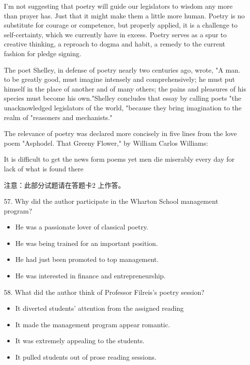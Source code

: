 \documentclass[UTF8,11pt]{ctexart}
\begin{document}
I'm not suggesting that poetry will guide our legislators to wisdom any more than prayer has. Just that it might make them a little more human. Poetry is no substitute for courage or competence, but properly applied, it is a challenge to self-certainty, which we currently have in excess. Poetry serves as a spur to creative thinking, a reproach to dogma and habit, a remedy to the current fashion for pledge signing.


The poet Shelley, in defense of poetry nearly two centuries ago, wrote, "A man. to be greatly good, must imagine intensely and comprehensively; he must put himself in the place of another and of many others; the pains and pleasures of his species must become his own."Shelley concludes that essay by calling poets "the unacknowledged legislators of the world, "because they bring imagination to the realm of "reasoners and mechanists."


The relevance of poetry was declared more concisely in five lines from the love poem "Asphodel. That Greeny Flower," by William Carlos Williams:


It is difficult to get the news form poems yet men die miserably every day for lack of what is found there


注意：此部分试题请在答题卡2 上作答。


57. Why did the author participate in the Wharton School management program?


\begin{itemize}[leftmargin=2em,itemsep=.2em,topsep=.4em]\item[A.] He was a passionate lover of classical poetry.
\item[B.] He was being trained for an important position.
\item[C.] He had just been promoted to top management.
\item[D.] He was interested in finance and entrepreneurship.
\end{itemize}

58. What did the author think of Professor Filreis's poetry session?


\begin{itemize}[leftmargin=2em,itemsep=.2em,topsep=.4em]\item[A.] It diverted students' attention from the assigned reading
\item[B.] It made the management program appear romantic.
\item[C.] It was extremely appealing to the students.
\item[D.] It pulled students out of prose reading sessions.
\end{itemize}
\end{document}
